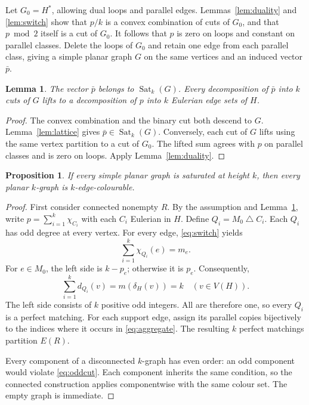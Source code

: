 \documentclass[10pt]{article}
\newtheorem{lemma}[theorem]{Lemma}
\newtheorem{proposition}[theorem]{Proposition}
\theoremstyle{definition}
\theoremstyle{remark}
\DeclareMathOperator{\Sat}{Sat}
\newcommand{\symd}{\mathbin{\triangle}}
\begin{document}
Let $G_0=H^*$, allowing dual loops and parallel edges.
Lemmas~\ref{lem:duality} and \ref{lem:switch} show that $p/k$ is a convex combination of cuts of $G_0$, and that $p\bmod2$ itself is a cut of $G_0$.
It follows that $p$ is zero on loops and constant on parallel classes.
Delete the loops of $G_0$ and retain one edge from each parallel class, giving a simple planar graph $G$ on the same vertices and an induced vector $\bar p$.

\begin{lemma}\label{lem:simplify}
The vector $\bar p$ belongs to $\Sat_k(G)$.
Every decomposition of $\bar p$ into $k$ cuts of $G$ lifts to a decomposition of $p$ into $k$ Eulerian edge sets of $H$.
\end{lemma}
\begin{proof}
The convex combination and the binary cut both descend to $G$.
Lemma~\ref{lem:lattice} gives $\bar p\in\Sat_k(G)$.
Conversely, each cut of $G$ lifts using the same vertex partition to a cut of $G_0$.
The lifted sum agrees with $p$ on parallel classes and is zero on loops.
Apply Lemma~\ref{lem:duality}.
\end{proof}

\begin{proposition}\label{prop:reverse}
If every simple planar graph is saturated at height $k$, then every planar $k$-graph is $k$-edge-colourable.
\end{proposition}
\begin{proof}
First consider connected nonempty $R$.
By the assumption and Lemma~\ref{lem:simplify}, write $p=\sum_{i=1}^k\chi_{C_i}$ with each $C_i$ Eulerian in $H$.
Define $Q_i=M_0\symd C_i$.
Each $Q_i$ has odd degree at every vertex.
For every edge, \eqref{eq:switch} yields
\begin{equation}\label{eq:aggregate}
 \sum_{i=1}^k\chi_{Q_i}(e)=m_e.
\end{equation}
For $e\in M_0$, the left side is $k-p_e$; otherwise it is $p_e$.
Consequently,
\begin{equation}\label{eq:budget}
 \sum_{i=1}^k d_{Q_i}(v)=m(\delta_H(v))=k\quad(v\in V(H)).
\end{equation}
The left side consists of $k$ positive odd integers.
All are therefore one, so every $Q_i$ is a perfect matching.
For each support edge, assign its parallel copies bijectively to the indices where it occurs in \eqref{eq:aggregate}.
The resulting $k$ perfect matchings partition $E(R)$.

Every component of a disconnected $k$-graph has even order: an odd component would violate \eqref{eq:oddcut}.
Each component inherits the same condition, so the connected construction applies componentwise with the same colour set.
The empty graph is immediate.
\end{proof}
\end{document}
